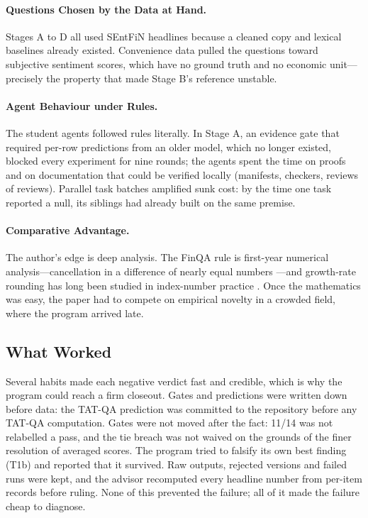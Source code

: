 \documentclass[11pt]{article}
\begin{document}
\paragraph{Questions Chosen by the Data at Hand.} Stages A to D all used SEntFiN headlines because a cleaned copy and lexical baselines already existed. Convenience data pulled the questions toward subjective sentiment scores, which have no ground truth and no economic unit---precisely the property that made Stage B's reference unstable.

\paragraph{Agent Behaviour under Rules.} The student agents followed rules literally. In Stage A, an evidence gate that required per-row predictions from an older model, which no longer existed, blocked every experiment for nine rounds; the agents spent the time on proofs and on documentation that could be verified locally (manifests, checkers, reviews of reviews). Parallel task batches amplified sunk cost: by the time one task reported a null, its siblings had already built on the same premise.

\paragraph{Comparative Advantage.} The author's edge is deep analysis. The FinQA rule is first-year numerical analysis---cancellation in a difference of nearly equal numbers \citep{higham2002accuracy}---and growth-rate rounding has long been studied in index-number practice \citep{gittings1991rounding}. Once the mathematics was easy, the paper had to compete on empirical novelty in a crowded field, where the program arrived late.

\subsection{What Worked}

Several habits made each negative verdict fast and credible, which is why the program could reach a firm closeout. Gates and predictions were written down before data: the TAT-QA prediction was committed to the repository before any TAT-QA computation. Gates were not moved after the fact: 11/14 was not relabelled a pass, and the tie breach was not waived on the grounds of the finer resolution of averaged scores. The program tried to falsify its own best finding (T1b) and reported that it survived. Raw outputs, rejected versions and failed runs were kept, and the advisor recomputed every headline number from per-item records before ruling. None of this prevented the failure; all of it made the failure cheap to diagnose.
\end{document}
